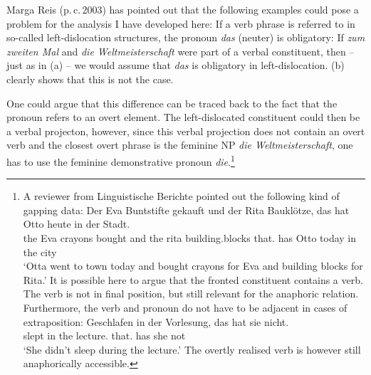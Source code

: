 Marga Reis (p.\,c.\,2003) has pointed out that the following examples could pose a problem for the analysis
I have developed here:
\eal
{}
\zl
If a verb phrase is referred to in so-called left-dislocation structures, the pronoun 
\emph{das} (neuter) is obligatory:
\eal
{}
\zl
If \emph{zum zweiten Mal} and \emph{die Weltmeisterschaft} were part of a verbal constituent, then -- just as
in (a) -- we would assume that \emph{das} is obligatory in left-dislocation. (b) clearly shows
that this is not the case.



One could argue that this difference can be traced back to the fact that the pronoun  refers to an overt element.
The left-dislocated constituent could then be a verbal projecton, however, since this verbal projection does not
contain an overt verb and the closest overt phrase is the feminine NP \emph{die Weltmeisterschaft}, one has to use
the feminine demonstrative pronoun \emph{die}.\footnote{
		A reviewer from Linguistische Berichte pointed out the following kind of gapping data:
\ea
\gll Der Eva Buntstifte gekauft und der Rita Bauklötze, das hat Otto heute in der Stadt.\\
	 the Eva crayons bought and the rita building.blocks that.\neu{} has Otto today in the city\\
\glt `Otta went to town today and bought crayons for Eva and building blocks for Rita.'
\z
It is possible here to argue that the fronted constituent contains a verb. The verb is not in final position, but
still relevant for the anaphoric relation. Furthermore, the verb and pronoun do not have to be adjacent in cases of
extraposition: 
\ea
\gll Geschlafen in der Vorlesung, das hat sie nicht.\\
	 slept in the lecture.\fem{} that.\neu{} has she not\\
\glt `She didn't sleep during the lecture.'
\z
The overtly realised verb is however still anaphorically accessible.
}




